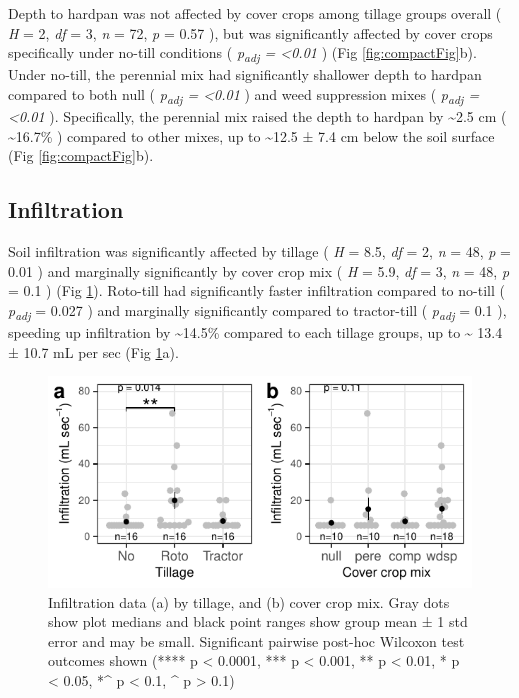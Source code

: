 \documentclass[
  12pt,
]{article}
\begin{document}
Depth to hardpan was not affected by cover crops among tillage groups overall (
\emph{H} = 2,
\emph{df} = 3,
\emph{n} = 72,
\emph{p} = 0.57
), but was significantly affected by cover crops specifically under no-till conditions (
\emph{p\textsubscript{adj} = \textless0.01}
) (Fig \ref{fig:compactFig}b).
Under no-till, the perennial mix had significantly shallower depth to hardpan compared to both null (
\emph{p\textsubscript{adj} = \textless0.01}
) and weed suppression mixes (
\emph{p\textsubscript{adj} = \textless0.01}
).
Specifically, the perennial mix raised the depth to hardpan by
\textasciitilde2.5 cm (
\textasciitilde16.7\%
) compared to other mixes,
up to
\textasciitilde12.5 ±
7.4 cm
below the soil surface
(Fig \ref{fig:compactFig}b).

\hypertarget{infiltration}{%
\subsection{Infiltration}\label{infiltration}}

Soil infiltration was significantly affected by tillage (
\emph{H} = 8.5,
\emph{df} = 2,
\emph{n} = 48,
\emph{p} = 0.01
) and marginally significantly by cover crop mix (
\emph{H} = 5.9,
\emph{df} = 3,
\emph{n} = 48,
\emph{p} = 0.1
) (Fig \ref{fig:infilFig}).
Roto-till had significantly faster infiltration compared to no-till (
\emph{p\textsubscript{adj}} = 0.027
) and marginally significantly compared to tractor-till (
\emph{p\textsubscript{adj}} = 0.1
), speeding up infiltration by
\textasciitilde14.5\%
compared to each tillage groups,
up to
\textasciitilde{} 13.4 ±
10.7 mL per sec
(Fig \ref{fig:infilFig}a).

\begin{figure}
\centering
\includegraphics{merge_files/figure-latex/infilFig-1.pdf}
\caption{\label{fig:infilFig}Infiltration data (a) by tillage, and (b) cover crop mix. Gray dots show plot medians and black point ranges show group mean ± 1 std error and may be small. Significant pairwise post-hoc Wilcoxon test outcomes shown (**** p \textless{} 0.0001, *** p \textless{} 0.001, ** p \textless{} 0.01, * p \textless{} 0.05, *\^{} p \textless{} 0.1, \^{} p \textgreater{} 0.1)}
\end{figure}
\end{document}
